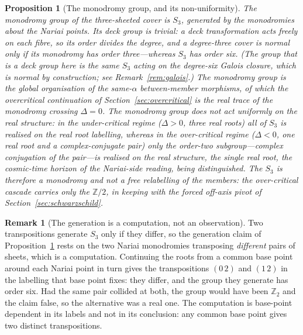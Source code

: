 \documentclass[11pt,a4paper]{article}
\newtheorem{proposition}[theorem]{Proposition}
\theoremstyle{definition}
\newtheorem{remark}[theorem]{Remark}
\begin{document}
\begin{proposition}[The monodromy group, and its non-uniformity]\label{prop:deck}
The \emph{monodromy} group of the three-sheeted cover is $S_{3}$, generated by the monodromies about the Nariai points. Its \emph{deck} group is trivial: a deck transformation acts freely on each fibre, so its order divides the degree, and a degree-three cover is normal only if its monodromy has order three---whereas $S_{3}$ has order six. (The group that \emph{is} a deck group here is the same $S_{3}$ acting on the degree-six Galois closure, which is normal by construction; see Remark~\ref{rem:galois}.) The monodromy group is the global organisation of the same-$\alpha$ between-member morphisms, of which the overcritical continuation of Section~\ref{sec:overcritical} is the real trace of the monodromy crossing $\Delta=0$. The monodromy group does not act uniformly on the real structure: in the under-critical regime ($\Delta>0$, three real roots) all of $S_{3}$ is realised on the real root labelling, whereas in the over-critical regime ($\Delta<0$, one real root and a complex-conjugate pair) only the order-two subgroup---complex conjugation of the pair---is realised on the real structure, the single real root, the cosmic-time horizon of the Nariai-side reading, being distinguished. The $S_{3}$ is therefore a \emph{monodromy} and not a free relabelling of the members: the over-critical cascade carries only the $\mathbb{Z}/2$, in keeping with the forced off-axis pivot of Section~\ref{sec:schwarzschild}.
\end{proposition}

\begin{remark}[The generation is a computation, not an observation]\label{rem:monodromy-group}
Two transpositions generate $S_{3}$ only if they differ, so the generation claim of
Proposition~\ref{prop:deck} rests on the two Nariai monodromies transposing \emph{different} pairs of sheets,
which is a computation. Continuing the roots from a common base point around each Nariai point in turn gives the
transpositions $(0\,2)$ and $(1\,2)$ in the labelling that base point fixes: they differ, and the group they
generate has order six. Had the same pair collided at both, the group would have been
$\mathbb{Z}_{2}$ and the claim false, so the alternative was a real one. The computation is base-point dependent
in its labels and not in its conclusion: any common base point gives two distinct transpositions.
\end{remark}
\end{document}
